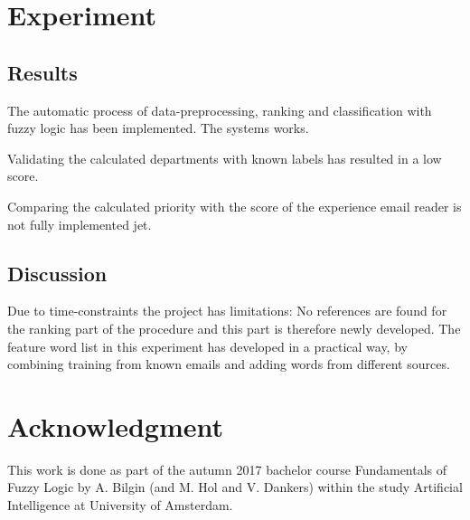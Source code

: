 \documentclass[journal]{IEEEtran}
\begin{document}
\section{Experiment}

\subsection{Results}

The automatic process of data-preprocessing, ranking and classification with fuzzy logic has been implemented. The systems works.

Validating the calculated departments with known labels has resulted in a low score.

Comparing the calculated priority with the score of the experience email reader is not fully implemented jet.

\subsection{Discussion}

Due to time-constraints the project has limitations: No references are found for the ranking part of the procedure and this part is therefore newly developed. The feature word list in this experiment has developed in a practical way, by combining training from known emails and adding words from different sources.

\section{Acknowledgment}

This work is done as part of the autumn 2017 bachelor course Fundamentals of Fuzzy Logic by A. Bilgin (and  M. Hol and V. Dankers) within the study Artificial Intelligence at University of Amsterdam.
\end{document}
